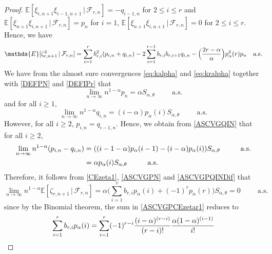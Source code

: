 \documentclass[twoside,12pt]{article}
\newcommand{\E}{\mathds{E}}
\begin{document}
\begin{proof}
$\E[\xi_{i,n+1} \xi_{i-1,n+1}\,|\,\mathcal{F}_{r,n}]=-q_{i-1,n}$ for $2 \leq i \leq r$ and
$\E[\xi_{n+1} \xi_{i,n+1} \,|\,\mathcal{F}_{r,n}]=p_n$ for $i=1$, $\E[\xi_{n+1} \xi_{i,n+1} \,|\,\mathcal{F}_{r,n}]=0$ for $2 \leq i \leq r$. Hence,
we have 
\begin{equation}
\label{CEzeta2}
\E[\zeta_{r,n+1}^2\,|\,\mathcal{F}_{r,n}]= \sum_{i=1}^{r}b_{r,i}^2(p_{i,n}+q_{i,n}) -2\sum_{i=1}^{r-1}b_{r,i}b_{r,i+1}q_{i,n} - \Bigl(\frac{2r-\alpha}{\alpha}\Bigr) p_{\alpha}^2(r)p_n
\quad \text{a.s.}
\end{equation}
We have from the almost sure convergences \eqref{eq:kalpha} and \eqref{eq:kralpha} together with \eqref{DEFPN} and \eqref{DEFIPr} that
\begin{equation}
\label{ASCVGPN}
\lim_{n \rightarrow \infty} n^{1-\alpha} p_n= \alpha S_{\alpha, \theta} \hspace{1cm} \text{a.s.}
\end{equation}
and for all $i \geq 1$,
\begin{equation}
\label{ASCVGQIN}
\lim_{n \rightarrow \infty} n^{1-\alpha} q_{i,n}= (i-\alpha) p_{\alpha}(i) S_{\alpha, \theta} \hspace{1cm} \text{a.s.}
\end{equation}
However, for all $i \geq 2$, $p_{i,n}=q_{i-1,n}$. Hence, we obtain from \eqref{ASCVGQIN} that for all $i \geq 2$, 
\begin{align}
\label{ASCVGPQINDif}
\lim_{n \rightarrow \infty} n^{1-\alpha} (p_{i,n}- q_{i,n})
&= ((i-1-\alpha) p_{\alpha}(i-1) -(i-\alpha) p_{\alpha}(i)) S_{\alpha, \theta} \notag
\hspace{1cm} \text{a.s.} \\
&=\alpha p_{\alpha}(i) S_{\alpha, \theta} \hspace{1cm} \text{a.s.}
\end{align}
Therefore, it follows from \eqref{CEzeta1}, \eqref{ASCVGPN} and \eqref{ASCVGPQINDif} that
\begin{equation}
\label{ASCVGPCEzetar1}
\lim_{n \rightarrow \infty} n^{1-\alpha} \E[\zeta_{r,n+1}\,|\,\mathcal{F}_{r,n}]= \alpha  \Big( \sum_{i=1}^{r}b_{r,i} p_{\alpha}(i) + (-1)^r  p_{\alpha}(r) \Big)S_{\alpha, \theta} =0 \hspace{1cm} \text{a.s.}
\end{equation}
since by the Binomial theorem, the sum in \eqref{ASCVGPCEzetar1} reduces to
\begin{align}
\sum_{i=1}^{r}b_{r,i} p_{\alpha}(i) &= \sum_{i=1}^{r}
(-1)^{r-i}\frac{(i-\alpha)^{(r-i)}}{(r-i)!} \frac{\alpha(1-\alpha)^{(i-1)}}{i!} \notag \\

\end{align}
\end{proof}
\end{document}
